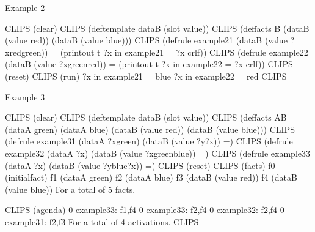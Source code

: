 \documentclass[letterpaper,10pt,english]{sphinxmanual}
\begin{document}
Example 2

\begin{sphinxVerbatim}[commandchars=\\\{\}]
  CLIPS\PYGZgt{} (clear)
  CLIPS\PYGZgt{} (deftemplate data\PYGZhy{}B (slot value))
  CLIPS\PYGZgt{}
  (deffacts B
(data\PYGZhy{}B (value red))
    (data\PYGZhy{}B (value blue)))
  CLIPS\PYGZgt{}
  (defrule example2\PYGZhy{}1
    (data\PYGZhy{}B (value ?x\PYGZam{}\PYGZti{}red\PYGZam{}\PYGZti{}green))
    =\PYGZgt{}
    (printout t \PYGZdq{}?x in example2\PYGZhy{}1 = \PYGZdq{} ?x crlf))
  CLIPS\PYGZgt{}
  (defrule example2\PYGZhy{}2
    (data\PYGZhy{}B (value ?x\PYGZam{}green\textbar{}red))
    =\PYGZgt{}
    (printout t \PYGZdq{}?x in example2\PYGZhy{}2 = \PYGZdq{} ?x crlf))
  CLIPS\PYGZgt{} (reset)
  CLIPS\PYGZgt{} (run)
  ?x in example2\PYGZhy{}1 = blue
  ?x in example2\PYGZhy{}2 = red
  CLIPS\PYGZgt{}
\end{sphinxVerbatim}

Example 3

\begin{sphinxVerbatim}[commandchars=\\\{\}]
CLIPS\PYGZgt{} (clear)
CLIPS\PYGZgt{} (deftemplate data\PYGZhy{}B (slot value))
CLIPS\PYGZgt{}
(deffacts AB
  (data\PYGZhy{}A green)
  (data\PYGZhy{}A blue)
  (data\PYGZhy{}B (value red))
  (data\PYGZhy{}B (value blue)))
CLIPS\PYGZgt{}
(defrule example3\PYGZhy{}1
  (data\PYGZhy{}A ?x\PYGZam{}\PYGZti{}green)
  (data\PYGZhy{}B (value ?y\PYGZam{}\PYGZti{}?x))
=\PYGZgt{})
CLIPS\PYGZgt{}
(defrule example3\PYGZhy{}2
  (data\PYGZhy{}A ?x)
  (data\PYGZhy{}B (value ?x\PYGZam{}green\textbar{}blue))
  =\PYGZgt{})
CLIPS\PYGZgt{}
(defrule example3\PYGZhy{}3
  (data\PYGZhy{}A ?x)
  (data\PYGZhy{}B (value ?y\PYGZam{}blue\textbar{}?x))
  =\PYGZgt{})
CLIPS\PYGZgt{} (reset)
CLIPS\PYGZgt{} (facts)
f\PYGZhy{}0 (initial\PYGZhy{}fact)
f\PYGZhy{}1 (data\PYGZhy{}A green)
f\PYGZhy{}2 (data\PYGZhy{}A blue)
f\PYGZhy{}3 (data\PYGZhy{}B (value red))
f\PYGZhy{}4 (data\PYGZhy{}B (value blue))
For a total of 5 facts.

CLIPS\PYGZgt{} (agenda)
0 example3\PYGZhy{}3: f\PYGZhy{}1,f\PYGZhy{}4
0 example3\PYGZhy{}3: f\PYGZhy{}2,f\PYGZhy{}4
0 example3\PYGZhy{}2: f\PYGZhy{}2,f\PYGZhy{}4
0 example3\PYGZhy{}1: f\PYGZhy{}2,f\PYGZhy{}3
For a total of 4 activations.
CLIPS\PYGZgt{}
\end{sphinxVerbatim}
\end{document}
